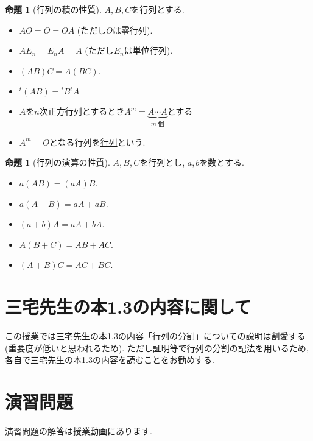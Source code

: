 \documentclass[dvipdfmx,a4paper,11pt]{article}
\theoremstyle{definition}
\newtheorem{prop}[thm]{命題}
\begin{document}
 \begin{tcolorbox}[
    colback = white,
    colframe = green!35!black,
    fonttitle = \bfseries,
    breakable = true]
    \begin{prop}[行列の積の性質]
$A,B,C$を行列とする.
 \begin{itemize}
 \item $AO =O = OA$ (ただし$O$は零行列).
  \item $AE_{n}=E_{n}A =A$ (ただし$E_n$は単位行列). 
  \item $(AB)C = A(BC)$.　
  \item ${}^{t}(AB) = {}^{t}B {}^{t}A$
 \end{itemize}
  \end{prop}
 \end{tcolorbox}
\begin{itemize}
\item $A$を$n$次正方行列とするとき$A^{m} = \underbrace{A \cdots A}_{m \text{ 個}}$とする
\item $A^{m}=O$となる行列を\underline{行列}という.
\end{itemize}

 \begin{tcolorbox}[
    colback = white,
    colframe = green!35!black,
    fonttitle = \bfseries,
    breakable = true]
    \begin{prop}[行列の演算の性質]
$A,B,C$を行列とし, $a,b$を数とする.
 \begin{itemize}
 \item $a(AB)=(aA)B$. 
  \item $a(A+B)=aA + aB$. 
  \item $(a+b)A = aA + bA$.　
  \item $A(B+C) = AB + AC$.
  \item $(A+B)C = AC + BC$.
 \end{itemize}
  \end{prop}
 \end{tcolorbox}
 
\section{三宅先生の本1.3の内容に関して}
この授業では三宅先生の本1.3の内容「行列の分割」についての説明は割愛する(重要度が低いと思われるため).
ただし証明等で行列の分割の記法を用いるため, 各自で三宅先生の本1.3の内容を読むことをお勧めする.

\section{演習問題}
演習問題の解答は授業動画にあります.
\end{document}

